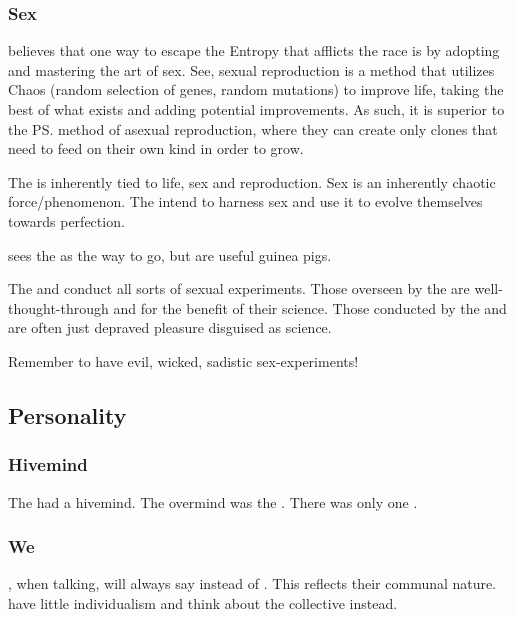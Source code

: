 \subsubsection{Sex}
 believes that one way to escape the Entropy that afflicts the \bane{} race is by adopting and mastering the art of sex. See, sexual reproduction is a method that utilizes Chaos (random selection of genes, random mutations) to improve life, taking the best of what exists and adding potential improvements. As such, it is superior to the \ps{\banes}{} method of asexual reproduction, where they can create only clones that need to feed on their own kind in order to grow. 

The  is inherently tied to life, sex and reproduction. Sex is an inherently chaotic force/phenomenon. The \banes{} intend to harness sex and use it to evolve themselves towards perfection. 

\Daggerrain{} sees the  as the way to go, but \humans{} are useful guinea pigs. 

The \banes{} and \resphain{} conduct all sorts of sexual experiments. Those overseen by the \banelords{} are well-thought-through and for the benefit of their science. Those conducted by the \resphain{} and \resviel{} are often just depraved pleasure disguised as science. 

Remember to have evil, wicked, sadistic sex-experiments! 









\subsection{Personality}





\subsubsection{Hivemind}
The \banes had a hivemind. 
The overmind was the \baneking \Voidbringer.
There was only one \baneking. 





\subsubsection{We}
\Banelords, when talking, will always say  instead of . 
This reflects their communal nature. 
\Banelords{} have little individualism and think about the collective instead. 

